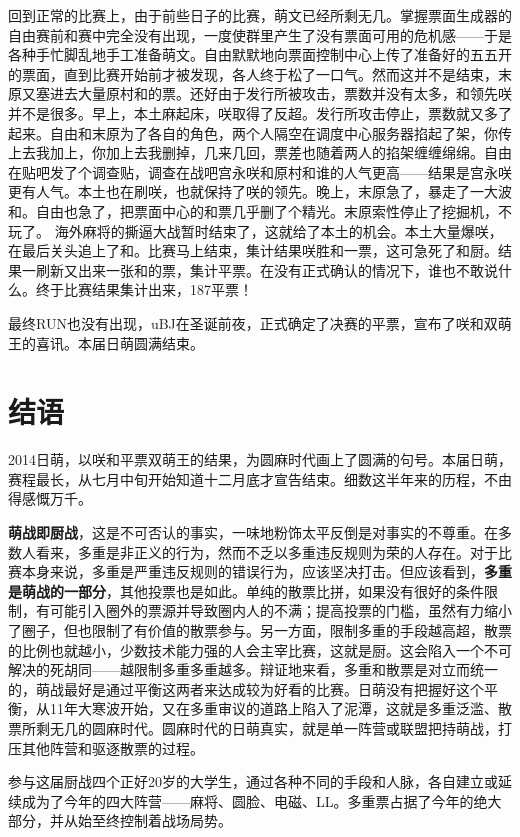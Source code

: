 回到正常的比赛上，由于前些日子的比赛，萌文已经所剩无几。掌握票面生成器的自由赛前和赛中完全没有出现，一度使群里产生了没有票面可用的危机感——于是各种手忙脚乱地手工准备萌文。自由默默地向票面控制中心上传了准备好的五五开的票面，直到比赛开始前才被发现，各人终于松了一口气。然而这并不是结束，末原又塞进去大量原村和的票。还好由于发行所被攻击，票数并没有太多，和领先咲并不是很多。早上，本土麻起床，咲取得了反超。发行所攻击停止，票数就又多了起来。自由和末原为了各自的角色，两个人隔空在调度中心服务器掐起了架，你传上去我加上，你加上去我删掉，几来几回，票差也随着两人的掐架缠缠绵绵。自由在贴吧发了个调查贴，调查在战吧宫永咲和原村和谁的人气更高——结果是宫永咲更有人气。本土也在刷咲，也就保持了咲的领先。晚上，末原急了，暴走了一大波和。自由也急了，把票面中心的和票几乎删了个精光。末原索性停止了挖掘机，不玩了。
海外麻将的撕逼大战暂时结束了，这就给了本土的机会。本土大量爆咲，在最后关头追上了和。比赛马上结束，集计结果咲胜和一票，这可急死了和厨。结果一刷新又出来一张和的票，集计平票。在没有正式确认的情况下，谁也不敢说什么。终于比赛结果集计出来，187平票！

最终RUN也没有出现，uBJ在圣诞前夜，正式确定了决赛的平票，宣布了咲和双萌王的喜讯。本届日萌圆满结束。

\chapter{结语}

2014日萌，以咲和平票双萌王的结果，为圆麻时代画上了圆满的句号。本届日萌，赛程最长，从七月中旬开始知道十二月底才宣告结束。细数这半年来的历程，不由得感慨万千。

\textbf{萌战即厨战}，这是不可否认的事实，一味地粉饰太平反倒是对事实的不尊重。在多数人看来，多重是非正义的行为，然而不乏以多重违反规则为荣的人存在。对于比赛本身来说，多重是严重违反规则的错误行为，应该坚决打击。但应该看到，\textbf{多重是萌战的一部分}，其他投票也是如此。单纯的散票比拼，如果没有很好的条件限制，有可能引入圈外的票源并导致圈内人的不满；提高投票的门槛，虽然有力缩小了圈子，但也限制了有价值的散票参与。另一方面，限制多重的手段越高超，散票的比例也就越小，少数技术能力强的人会主宰比赛，这就是厨。这会陷入一个不可解决的死胡同——越限制多重多重越多。辩证地来看，多重和散票是对立而统一的，萌战最好是通过平衡这两者来达成较为好看的比赛。日萌没有把握好这个平衡，从11年大寒波开始，又在多重审议的道路上陷入了泥潭，这就是多重泛滥、散票所剩无几的圆麻时代。圆麻时代的日萌真实，就是单一阵营或联盟把持萌战，打压其他阵营和驱逐散票的过程。

参与这届厨战四个正好20岁的大学生，通过各种不同的手段和人脉，各自建立或延续成为了今年的四大阵营——麻将、圆脸、电磁、LL。多重票占据了今年的绝大部分，并从始至终控制着战场局势。

